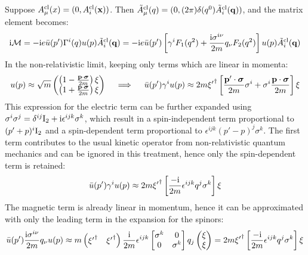 Suppose $ A^\text{cl}_\mu(x) = (0 , A^\text{cl}_i(\mathbf{x})) $. Then $ \tilde{A}^\text{cl}_\mu(q) = (0 , (2\pi) \delta(q^0) \tilde{A}^\text{cl}_i(\mathbf{q})) $, and the matrix element becomes:
\begin{equation*}
  \mathrm{i} \mathcal{M} = - \mathrm{i} e \bar{u}(p') \Gamma^i(q) u(p) \tilde{A}^\text{cl}_i(\mathbf{q}) = - \mathrm{i} e \bar{u}(p') \left[ \gamma^i F_1(q^2) + \frac{\mathrm{i} \sigma^{i \nu}}{2m} q_\nu F_2(q^2) \right] u(p) \tilde{A}^\text{cl}_i(\mathbf{q})
\end{equation*}
In the non-relativistic limit, keeping only terms which are linear in momenta:
\begin{equation*}
  u(p) \approx \sqrt{m}
  \begin{pmatrix}
    \left( 1 - \frac{\mathbf{p} \cdot \boldsymbol{\sigma}}{2m} \right) \xi \\
    \left( 1 + \frac{\mathbf{p} \cdot \boldsymbol{\sigma}}{2m} \right) \xi \\
  \end{pmatrix}
  \quad \implies \quad
  \bar{u}(p') \gamma^i u(p) \approx 2m {\xi'}^\dagger \left[ \frac{\mathbf{p}' \cdot \boldsymbol{\sigma}}{2m} \sigma^i + \sigma^i \frac{\mathbf{p} \cdot \boldsymbol{\sigma}}{2m} \right] \xi
\end{equation*}
This expression for the electric term can be further expanded using $ \sigma^i \sigma^j = \delta^{ij} \mathrm{I}_2 + \mathrm{i} \epsilon^{ijk} \sigma^k $, which result in a spin-independent term proportional to $ (p' + p)^i \mathrm{I}_2 $ and a spin-dependent term proportional to $ \epsilon^{ijk} (p' - p)^j \sigma^k $. The first term contributes to the usual kinetic operator from non-relativistic quantum mechanics and can be ignored in this treatment, hence only the spin-dependent term is retained:
\begin{equation*}
  \bar{u}(p') \gamma^i u(p) \approx 2m {\xi'}^\dagger \left[ \frac{-\mathrm{i}}{2m} \epsilon^{ijk} q^j \sigma^k \right] \xi
\end{equation*}
The magnetic term is already linear in momentum, hence it can be approximated with only the leading term in the expansion for the spinors:
\begin{equation*}
  \bar{u}(p') \frac{\mathrm{i} \sigma^{i \nu}}{2m} q_\nu u(p) \approx m
  \begin{pmatrix}
    {\xi'}^\dagger & {\xi'}^\dagger
  \end{pmatrix}
  \frac{\mathrm{i}}{2m} \epsilon^{ijk}
  \begin{bmatrix}
    \sigma^k & 0 \\ 0 & \sigma^k
  \end{bmatrix}
  q_j
  \begin{pmatrix}
    \xi \\ \xi
  \end{pmatrix}
  = 2m {\xi'}^\dagger \left[ \frac{-\mathrm{i}}{2m} \epsilon^{ijk} q^j \sigma^k \right] \xi
\end{equation*}
